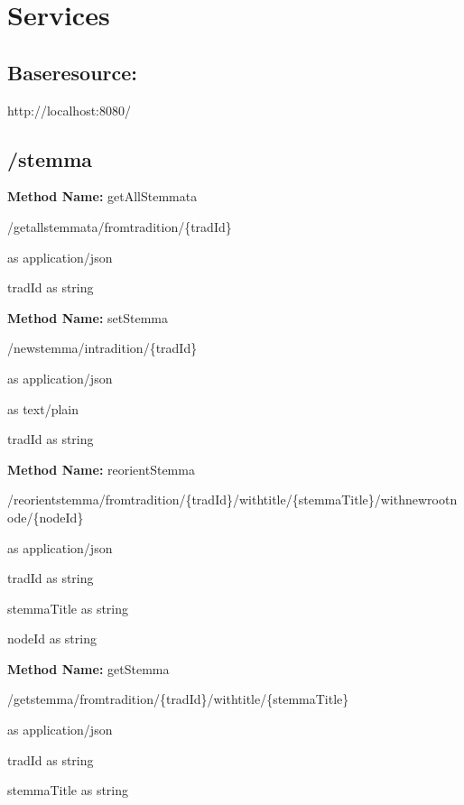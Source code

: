 \chapter{Services}
\section{Baseresource: }
http://localhost:8080/
\section{/stemma}
\textbf{Method Name: }getAllStemmata
\begin{get}
/getallstemmata/fromtradition/\{tradId\}
\end{get}
\begin{response}
 as application/json
\end{response}
\begin{parameter}
tradId as string
\end{parameter}
\textbf{Method Name: }setStemma
\begin{post}
/newstemma/intradition/\{tradId\}
\end{post}
\begin{request}
 as application/json
\end{request}
\begin{response}
 as text/plain
\end{response}
\begin{parameter}
tradId as string
\end{parameter}
\textbf{Method Name: }reorientStemma
\begin{post}
/reorientstemma/fromtradition/\{tradId\}/withtitle/\{stemmaTitle\}/withnewrootnode/\{nodeId\}
\end{post}
\begin{response}
 as application/json
\end{response}
\begin{parameter}
tradId as string
\end{parameter}
\begin{parameter}
stemmaTitle as string
\end{parameter}
\begin{parameter}
nodeId as string
\end{parameter}
\textbf{Method Name: }getStemma
\begin{get}
/getstemma/fromtradition/\{tradId\}/withtitle/\{stemmaTitle\}
\end{get}
\begin{response}
 as application/json
\end{response}
\begin{parameter}
tradId as string
\end{parameter}
\begin{parameter}
stemmaTitle as string
\end{parameter}
